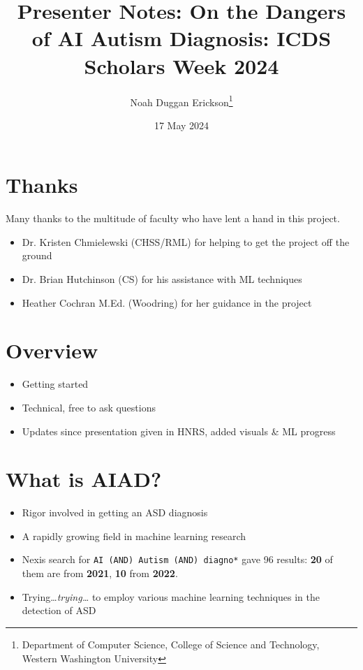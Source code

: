 \documentclass[twoside, letterpaper, twocolumn]{article}
\title{Presenter Notes: On the Dangers of AI Autism Diagnosis: ICDS Scholars Week 2024}
\author{Noah Duggan Erickson\thanks{Department of Computer Science, College of Science and Technology, Western Washington University}}
\date{17 May 2024}
\begin{document}
\maketitle

\section*{Thanks}
Many thanks to the multitude of faculty who have lent a hand in this project.
{\footnotesize
\begin{itemize}
    \item Dr. Kristen Chmielewski (CHSS/RML) for helping to get the project off the ground
    \item Dr. Brian Hutchinson (CS) for his assistance with ML techniques
    \item Heather Cochran M.Ed. (Woodring) for her guidance in the project
\end{itemize}}
\section{Overview}
\begin{itemize}
    \item Getting started
    \item Technical, free to ask questions
    \item Updates since presentation given in HNRS, added visuals \& ML progress
\end{itemize}
\section{What is AIAD?}
\begin{itemize}
    \item Rigor involved in getting an ASD diagnosis
    \item A rapidly growing field in machine learning research
    \item Nexis search for \texttt{AI (AND) Autism (AND) diagno*} gave 96 results: \textbf{20} of them are from \textbf{2021}, \textbf{10} from \textbf{2022}.
    \item Trying\dots \textit{trying\dots} to employ various machine learning techniques in the detection of ASD
\end{itemize}
\end{document}
